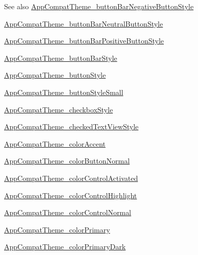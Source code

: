 \begin{DoxySeeAlso}{See also}
\hyperlink{classandroid_1_1support_1_1v4_1_1R_1_1styleable_a82c991e2fa9810fd845a9728c7cea014}{App\+Compat\+Theme\+\_\+button\+Bar\+Negative\+Button\+Style} 

\hyperlink{classandroid_1_1support_1_1v4_1_1R_1_1styleable_aa58b2ce8a1ce16e8e54a6c8b84a6d15c}{App\+Compat\+Theme\+\_\+button\+Bar\+Neutral\+Button\+Style} 

\hyperlink{classandroid_1_1support_1_1v4_1_1R_1_1styleable_a94cd4ce61573e443fe4e9bb2a2d8e7c7}{App\+Compat\+Theme\+\_\+button\+Bar\+Positive\+Button\+Style} 

\hyperlink{classandroid_1_1support_1_1v4_1_1R_1_1styleable_a833b29c75685e8a0ac239143d3e6fb6e}{App\+Compat\+Theme\+\_\+button\+Bar\+Style} 

\hyperlink{classandroid_1_1support_1_1v4_1_1R_1_1styleable_a0a6f685c4d17c8080102fccc12ae235a}{App\+Compat\+Theme\+\_\+button\+Style} 

\hyperlink{classandroid_1_1support_1_1v4_1_1R_1_1styleable_a94aeecf1f336663e0e81694de154135c}{App\+Compat\+Theme\+\_\+button\+Style\+Small} 

\hyperlink{classandroid_1_1support_1_1v4_1_1R_1_1styleable_aa590bb5373f4b9fd718702b7c9454c66}{App\+Compat\+Theme\+\_\+checkbox\+Style} 

\hyperlink{classandroid_1_1support_1_1v4_1_1R_1_1styleable_a62b92d2bf4651c1c6fe848d00c83ebe2}{App\+Compat\+Theme\+\_\+checked\+Text\+View\+Style} 

\hyperlink{classandroid_1_1support_1_1v4_1_1R_1_1styleable_a70404ad3a5e8a8979dec037058215d60}{App\+Compat\+Theme\+\_\+color\+Accent} 

\hyperlink{classandroid_1_1support_1_1v4_1_1R_1_1styleable_a348ced1d660bc34dcde74f87751119ba}{App\+Compat\+Theme\+\_\+color\+Button\+Normal} 

\hyperlink{classandroid_1_1support_1_1v4_1_1R_1_1styleable_a0b39cc5b040b1cd3704ee635afa68425}{App\+Compat\+Theme\+\_\+color\+Control\+Activated} 

\hyperlink{classandroid_1_1support_1_1v4_1_1R_1_1styleable_afc6290158c8ec3418e088f79325e48cd}{App\+Compat\+Theme\+\_\+color\+Control\+Highlight} 

\hyperlink{classandroid_1_1support_1_1v4_1_1R_1_1styleable_a6b58e52a257785d873805b5e1779ea2b}{App\+Compat\+Theme\+\_\+color\+Control\+Normal} 

\hyperlink{classandroid_1_1support_1_1v4_1_1R_1_1styleable_a7666c3232d0c44882bd1b7b81694ec22}{App\+Compat\+Theme\+\_\+color\+Primary} 

\hyperlink{classandroid_1_1support_1_1v4_1_1R_1_1styleable_a86a4e758d00bd09c64f8125e28a09831}{App\+Compat\+Theme\+\_\+color\+Primary\+Dark} 


\end{DoxySeeAlso}
